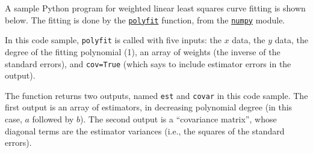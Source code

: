 \documentclass[11pt,a4paper]{article}
\begin{document}
A sample Python program for weighted linear least squares curve
fitting is shown below.  The fitting is done by the
\href{https://docs.scipy.org/doc/numpy/reference/generated/numpy.polyfit.html}{\texttt{polyfit}}
function, from the \href{http://www.numpy.org/}{\texttt{numpy}}
module.

In this code sample, \texttt{polyfit} is called with five inputs: the
$x$ data, the $y$ data, the degree of the fitting polynomial (1), an
array of weights (the inverse of the standard errors), and
\texttt{cov=True} (which says to include estimator errors in the
output).

The function returns two outputs, named \texttt{est} and
\texttt{covar} in this code sample.  The first output is an array of
estimators, in decreasing polynomial degree (in this case, $a$
followed by $b$).  The second output is a ``covariance matrix'', whose
diagonal terms are the estimator variances (i.e., the squares of the
standard errors).
\end{document}
